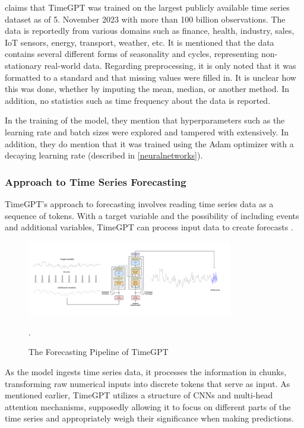 \documentclass[12pt,a4paper]{article}
\begin{document}
\cite{garza2023timegpt1} claims that TimeGPT was trained on the largest publicly available time series dataset as of 5. November 2023 with more than 100 billion observations. The data is reportedly from various domains such as finance, health, industry, sales, IoT sensors, energy, transport, weather, etc. It is mentioned that the data contains several different forms of seasonality and cycles, representing non-stationary real-world data. Regarding preprocessing, it is only noted that it was formatted to a standard and that missing values were filled in. It is unclear how this was done, whether by imputing the mean, median, or another method. In addition, no statistics such as time frequency about the data is reported. 

In the training of the model, they mention that hyperparameters such as the learning rate and batch sizes were explored and tampered with extensively. In addition, they do mention that it was trained using the Adam optimizer with a decaying learning rate (described in \ref{neuralnetworks}). 

\subsubsection{Approach to Time Series Forecasting}

TimeGPT's approach to forecasting involves reading time series data as a sequence of tokens. With a target variable and the possibility of including events and additional variables, TimeGPT can process input data to create forecasts \parencite{Nixtla}.

\begin{figure}[htbp]
  \centering
  \includegraphics[width=0.8\textwidth]{timegpt_forecast.png}
  \caption{The Forecasting Pipeline of TimeGPT \parencite{garza2023timegpt1}}.
  \label{timegptforecast}
\end{figure}

As the model ingests time series data, it processes the information in chunks, transforming raw numerical inputs into discrete tokens that serve as input. As mentioned earlier, TimeGPT utilizes a structure of CNNs and multi-head attention mechanisms, supposedly allowing it to focus on different parts of the time series and appropriately weigh their significance when making predictions.
\end{document}
